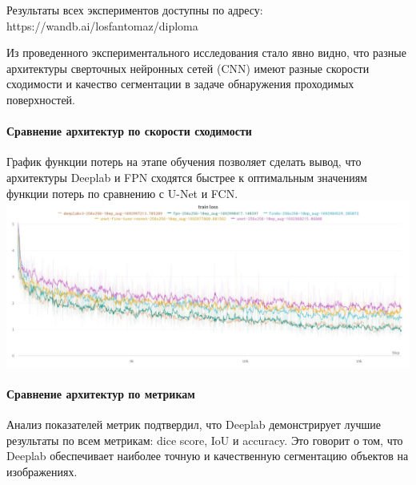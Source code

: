 \documentclass[11pt]{article}
\begin{document}
Результаты всех экспериментов доступны по адресу:
https://wandb.ai/losfantomaz/diploma

    Из проведенного экспериментального исследования стало явно видно, что
разные архитектуры сверточных нейронных сетей (CNN) имеют разные
скорости сходимости и качество сегментации в задаче обнаружения
проходимых поверхностей.

\hypertarget{ux441ux440ux430ux432ux43dux435ux43dux438ux435-ux430ux440ux445ux438ux442ux435ux43aux442ux443ux440-ux43fux43e-ux441ux43aux43eux440ux43eux441ux442ux438-ux441ux445ux43eux434ux438ux43cux43eux441ux442ux438}{%
\paragraph{Сравнение архитектур по скорости
сходимости}\label{ux441ux440ux430ux432ux43dux435ux43dux438ux435-ux430ux440ux445ux438ux442ux435ux43aux442ux443ux440-ux43fux43e-ux441ux43aux43eux440ux43eux441ux442ux438-ux441ux445ux43eux434ux438ux43cux43eux441ux442ux438}}

График функции потерь на этапе обучения позволяет сделать вывод, что
архитектуры Deeplab и FPN сходятся быстрее к оптимальным значениям
функции потерь по сравнению с U-Net и FCN.
\includegraphics{../resources/train-loss.jpg}

\hypertarget{ux441ux440ux430ux432ux43dux435ux43dux438ux435-ux430ux440ux445ux438ux442ux435ux43aux442ux443ux440-ux43fux43e-ux43cux435ux442ux440ux438ux43aux430ux43c}{%
\paragraph{Сравнение архитектур по
метрикам}\label{ux441ux440ux430ux432ux43dux435ux43dux438ux435-ux430ux440ux445ux438ux442ux435ux43aux442ux443ux440-ux43fux43e-ux43cux435ux442ux440ux438ux43aux430ux43c}}

Анализ показателей метрик подтвердил, что Deeplab демонстрирует лучшие
результаты по всем метрикам: dice score, IoU и accuracy. Это говорит о
том, что Deeplab обеспечивает наиболее точную и качественную сегментацию
объектов на изображениях.
\end{document}
